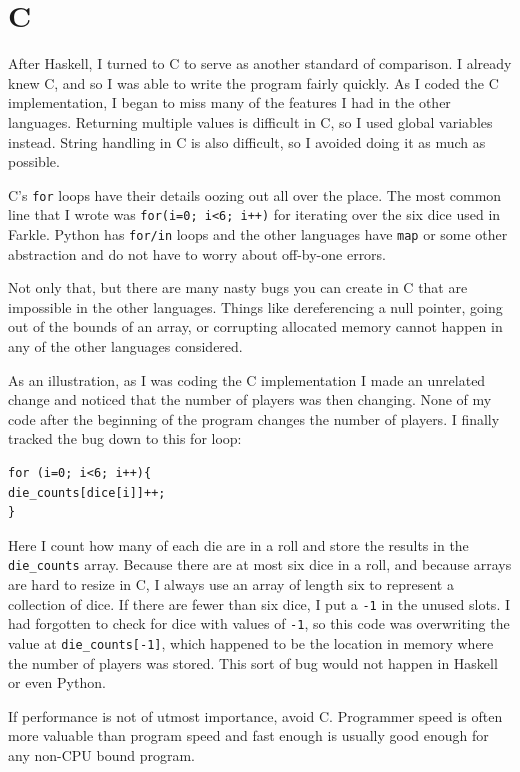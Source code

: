 \documentclass{article}
\begin{document}
\section{C}

After Haskell, I turned to C to serve as another standard of comparison.  I
already knew C, and so I was able to write the program fairly quickly.  As I
coded the C implementation, I began to miss many of the features I had in the
other languages.  Returning multiple values is difficult in C, so I used global
variables instead.  String handling in C is also difficult, so I avoided doing
it as much as possible.

C's \texttt{for} loops have their details oozing out all over the place.  The
most common line that I wrote was \texttt{for(i=0; i<6; i++)} for iterating over
the six dice used in Farkle.  Python has \texttt{for/in} loops and the other
languages have \texttt{map} or some other abstraction and do not have to worry
about off-by-one errors.

Not only that, but there are many nasty bugs you can create in C that are
impossible in the other languages.  Things like dereferencing a null pointer,
going out of the bounds of an array, or corrupting allocated memory cannot
happen in any of the other languages considered.

As an illustration, as I was coding the C implementation I made an unrelated
change and noticed that the number of players was then changing.  None of my
code after the beginning of the program changes the number of players.  I
finally tracked the bug down to this for loop:

\begin{verbatim}
for (i=0; i<6; i++){
die_counts[dice[i]]++;
}
\end{verbatim}

Here I count how many of each die are in a roll and store the results in the
\texttt{die\_counts} array.  Because there are at most six dice in a roll, and
because arrays are hard to resize in C, I always use an array of length six to
represent a collection of dice.  If there are fewer than six dice, I put a
\texttt{-1} in the unused slots.  I had forgotten to check for dice with values
of \texttt{-1}, so this code was overwriting the value at
\texttt{die\_counts[-1]}, which happened to be the location in memory where the
number of players was stored.  This sort of bug would not happen in Haskell or
even Python.

If performance is not of utmost importance, avoid C.  Programmer speed is often
more valuable than program speed and fast enough is usually good enough for any
non-CPU bound program.
\end{document}
